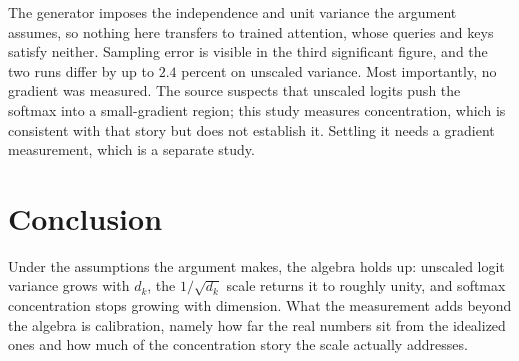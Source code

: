 \documentclass[11pt]{article}
\begin{document}
The generator imposes the independence and unit variance the argument assumes,
so nothing here transfers to trained attention, whose queries and keys satisfy
neither. Sampling error is visible in the third significant figure, and the
two runs differ by up to $2.4$ percent on unscaled variance. Most importantly,
no gradient was measured. The source suspects that unscaled logits push the
softmax into a small-gradient region; this study measures concentration, which
is consistent with that story but does not establish it. Settling it needs a
gradient measurement, which is a separate study.

\section{Conclusion}

Under the assumptions the argument makes, the algebra holds up: unscaled logit
variance grows with $d_k$, the $1/\sqrt{d_k}$ scale returns it to roughly
unity, and softmax concentration stops growing with dimension. What the
measurement adds beyond the algebra is calibration, namely how far the real
numbers sit from the idealized ones and how much of the concentration story
the scale actually addresses.
\end{document}

